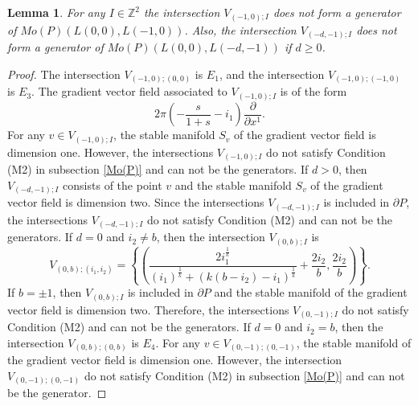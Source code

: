 \documentclass[12pt,reqno]{amsart}
\newcommand{\Z}{{\mathbb{Z}}}
\newcommand{\del}{{\partial}}
\newtheorem{lem}[thm]{Lemma}%
\theoremstyle{definition}
\begin{document}
\begin{lem}
For any $I\in\Z^2$ the intersection $V_{(-1,0);I}$ does not form a generator of $Mo(P)(L(0,0),L(-1,0))$. Also, the intersection $V_{(-d,-1);I}$ does not form a generator of $Mo(P)(L(0,0),L(-d,-1))$ if $d\geq0$.
\end{lem}
\begin{proof}
The intersection $V_{(-1,0);(0,0)}$ is $E_1$, and the intersection $V_{(-1,0);(-1,0)}$ is $E_3$.  The gradient vector field associated to $V_{(-1,0);I}$ is of the form
\begin{equation*}
2\pi\left(-\frac{s}{1+s} - i_1\right)\frac{\del}{\del x^1}.
\end{equation*}
For any $v\in V_{(-1,0);I}$, the stable manifold $S_v$ of the gradient vector field is dimension one. However, the intersections $V_{(-1,0);I}$ do not satisfy Condition (M2) in subsection \ref{Mo(P)} and can not be the generators. 
If $d>0$, then $V_{(-d,-1);I}$ consists of the point $v$ and the stable manifold $S_v$ of the gradient vector field is dimension two. Since the intersections $V_{(-d,-1);I}$ is included in $\del P$, the intersections $V_{(-d,-1);I}$ do not satisfy Condition (M2) and can not be the generators. 
If $d=0$ and $i_2\neq b$, then the intersection $V_{(0,b);I}$ is
\begin{equation*}
V_{(0,b);(i_1,i_2)} =\left\{ \left( \frac{2i_1^{\frac{1}{k}}}{(i_1)^{\frac{1}{k}}+(k(b-i_2)-i_1)^{\frac{1}{k}}} + \frac{2i_2}{b} , \frac{2i_2}{b} \right)\right\}.
\end{equation*} 
If $b=\pm1$, then $V_{(0,b);I}$ is included in $\del P$ and the stable manifold of the gradient vector field is dimension two. Therefore, the intersections $V_{(0,-1);I}$ do not satisfy Condition (M2) and can not be the generators. 
If $d=0$ and $i_2= b$, then the intersection $V_{(0,b);(0,b)}$ is $E_4$. For any $v\in V_{(0,-1);(0,-1)}$, the stable manifold of the gradient vector field is dimension one. However, the intersection $V_{(0,-1);(0,-1)}$ do not satisfy Condition (M2) in subsection \ref{Mo(P)} and can not be the generator. 
\end{proof}
\end{document}
